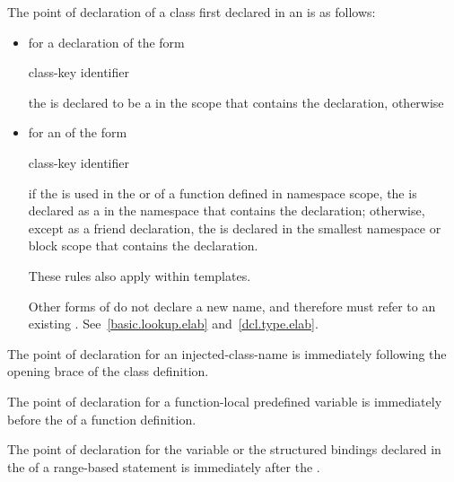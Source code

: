 \pnum
The point of declaration of a class first declared in an
 is as follows:
\begin{itemize}
\item for a declaration of the form

\begin{ncbnf}
class-key  identifier \terminal{;}
\end{ncbnf}

the  is declared to be a
 in the scope that contains the declaration,
otherwise
\item for an  of the form

\begin{ncbnf}
class-key identifier
\end{ncbnf}

if the
 is used in the
 or 
of a function defined in namespace scope, the  is
declared as a  in the namespace that contains the
declaration; otherwise, except as a friend declaration, the
 is declared in the smallest namespace or block
scope that contains the declaration. \begin{note}
These rules also apply within templates. \end{note} \begin{note} Other
forms of  do not declare a new name,
and therefore must refer to an existing .
See~\ref{basic.lookup.elab} and~\ref{dcl.type.elab}. \end{note}
\end{itemize}

\pnum
The point of declaration for an
injected-class-name is immediately following
the opening brace of the class definition.

\pnum
The point of declaration for a function-local predefined
variable is immediately before the
 of a function definition.

\pnum
The point of declaration for the variable or the structured bindings
declared in the 
of a range-based  statement
is immediately after the .


